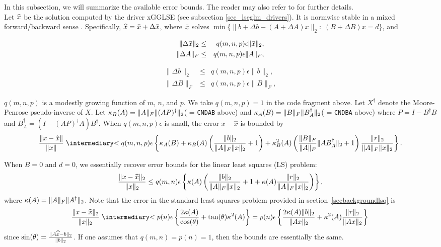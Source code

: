 In this subsection, we will summarize the available error bounds.
The reader may also refer to \cite{lawn31,coxhigham,elden} for
further details.  \\

\noindent
Let $\widehat{x}$ be the solution computed by the driver 
xGGLSE (see subsection
\ref{sec_lseglm_drivers}).  It is normwise
stable in a mixed forward/backward sense \cite{coxhigham}.
Specifically, $\widehat{x} = \bar{x} + \Delta \bar{x}$, where $\bar{x}$ solves
$\min\{\| b + \Delta b - (A + \Delta A)x \|_2: \; (B + \Delta B)x = d \} $,
and
\begin{center}
\parbox{2in}{
  \begin{eqnarray*}
  \| \Delta \bar{x} \|_2 & \leq & q(m,n,p) \epsilon\|\bar{x}\|_2, \\
  \| \Delta A \|_F & \leq & q(m,n,p)\epsilon\|A\|_F,
  \end{eqnarray*} }\quad
\parbox{2in}{
  \begin{eqnarray*}
  \| \Delta b \|_2 & \leq & q(m,n,p)\epsilon\|b\|_2, \\
  \| \Delta B \|_F & \leq & q(m,n,p)\epsilon\|B\|_F,
  \end{eqnarray*}
}
\end{center}
$q(m,n,p)$ is a modestly growing function of $m$, $n$, and $p$.
We take $q(m,n,p) = 1$ in the code fragment above.
Let $X^{\dagger}$ denote the Moore-Penrose pseudo-inverse of $X$.
Let $\kappa_B(A) = \| A \|_F\| (AP)^\dagger \|_2$( = {\tt CNDAB} above) and
    $\kappa_A(B) = \| B \|_F\| B^\dagger_A \|_2$( = {\tt CNDBA} above)
where $P = I - B^\dagger B$ and $B^\dagger_A = (I - (AP)^\dagger A)B^\dagger$.
When $q(m,n,p)\epsilon$ is small, the error $x-\hat{x}$ is bounded by
$$
 \frac{\norma{x-\hat{x}}}{\norma{x}} \lapproxeq q(m,n,p)\epsilon\left\{
      \kappa_A(B) +
      \kappa_B(A)\left(\frac{\nrmtwo{b}}{\nrmfro{A}\nrmtwo{x}} + 1 \right) +
      \kappa^2_B(A)\left( \frac{\nrmfro{B}}{\nrmfro{A}}\nrmtwo{AB^\dagger_A} +
                     1\right)\frac{\nrmtwo{r}}{\nrmfro{A}\nrmtwo{x}} \right\}.
$$

\vspace{.2in}

\noindent
When $B = 0$ and $d = 0$, we essentially recover error bounds for the
linear least squares (LS) problem:
$$
 \frac{\| x-\widehat{x} \|_2}{\| x \|_2} \leq q(m,n)\epsilon
      \left\{\kappa(A)\left(
          \frac{\| b \|_2}{\| A \|_F\| x \|_2} + 1 +
          \kappa(A)\frac{\| r \|_2}{\| A \|_F\| x \|_2} \right) \right\},
$$
where $\kappa(A) = \| A \|_F\| A^\dagger \|_2$. Note that
the error in the standard least squares problem provided in section~\ref{secbackgroundlsq} is
\[
 \frac{\nrmtwo{x-\ha{x}}}{\nrmtwo{x}} \lapproxeq p(n)\epsilon
      \left\{\frac{2\kappa(A)}{\cos(\theta)} + \tan(\theta)\kappa^2(A)\right\}
      =  p(n)\epsilon \left\{\frac{2\kappa(A)\nrmtwo{b}}{\nrmtwo{Ax}} +
                  \kappa^2(A)\frac{\nrmtwo{r}}{\nrmtwo{Ax}}\right\}\\
\]
since $\sin(\theta) = \frac{\| A\widehat{x}-b \|_2}{\| b \|_2}$.  If one assumes
that $q(m,n) = p(n) = 1$, then the bounds are essentially the same. \\

